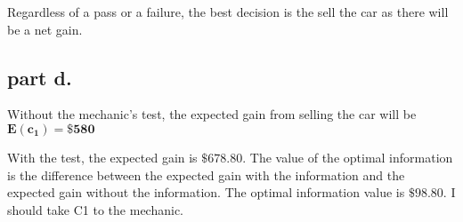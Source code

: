 Regardless of a pass or a failure, the best decision is the sell the car as there will be a net gain.

\subsection{part d.}
Without the mechanic's test, the expected gain from selling the car will be 
$\mathbf{E(c_1) = \$580} $

With the test, the expected gain is $\mathbf{ \$678.80}$. The value of the optimal information is the difference between the expected gain with the information and the expected gain without the information. The optimal information value is $\mathbf{\$98.80}$.
I should take C1 to the mechanic.

